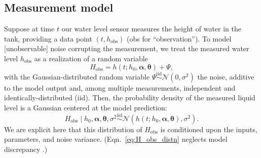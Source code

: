 \documentclass[a4paper,fleqn]{cas-dc}
\newcommand\themodelnomath {h(t; h_0, \boldsymbol \alpha, \boldsymbol\theta)}
\begin{document}
\subsection{Measurement model}
Suppose at time $t$ our water level sensor measures the height of water in the tank, providing a data point $(t, h_{\text{obs}})$ (obs for ``observation''). 
To model [unobservable] noise corrupting the measurement, we treat the measured water level $h_{\text{obs}}$ as a realization of a random variable
\begin{equation}
	H_{\text{obs}} = \themodelnomath + \Psi,
\end{equation}
with the Gaussian-distributed random variable $\Psi \overset{\text{iid}}{\sim} \mathcal{N}(0, \sigma^2)$ the noise, additive to the model output and, among multiple measurements, independent and identically-distributed (iid). 
Then, the probability density of the measured liquid level is a Gaussian centered at the model prediction:
\begin{equation}
	H_{\text{obs}} \mid h_0, \boldsymbol \alpha, \boldsymbol  \theta, \sigma^2 \overset{\text{iid}}{\sim} \mathcal{N}(\themodelnomath, \sigma^2). \label{eq:H_obs_distn}
\end{equation} We are explicit here that this distribution of $H_{\text{obs}}$ is conditioned upon the inputs, parameters, and noise variance. 
(Eqn.~\ref{eq:H_obs_distn} neglects model discrepancy \cite{brynjarsdottir2014learning}.)

\end{document}
